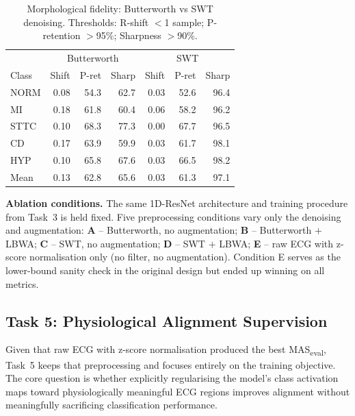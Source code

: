\documentclass{article}
\begin{document}
\begin{table}[h!]
\caption{Morphological fidelity: Butterworth vs SWT denoising.
Thresholds: R-shift $<$1 sample; P-retention $>$95\%; Sharpness $>$90\%.}
\label{tab:fidelity}
\vskip 0.1in
\begin{center}
\begin{small}
\begin{tabular}{lrrr|rrr}
\toprule
& \multicolumn{3}{c|}{Butterworth} & \multicolumn{3}{c}{SWT} \\
Class & Shift & P-ret & Sharp & Shift & P-ret & Sharp \\
\midrule
NORM & 0.08 & 54.3 & 62.7 & 0.03 & 52.6 & 96.4 \\
MI   & 0.18 & 61.8 & 60.4 & 0.06 & 58.2 & 96.2 \\
STTC & 0.10 & 68.3 & 77.3 & 0.00 & 67.7 & 96.5 \\
CD   & 0.17 & 63.9 & 59.9 & 0.03 & 61.7 & 98.1 \\
HYP  & 0.10 & 65.8 & 67.6 & 0.03 & 66.5 & 98.2 \\
Mean & 0.13 & 62.8 & 65.6 & 0.03 & 61.3 & 97.1 \\
\bottomrule
\end{tabular}
\end{small}
\end{center}
\end{table}

\textbf{Ablation conditions.}
The same 1D-ResNet architecture and training procedure from Task~3
is held fixed. Five preprocessing conditions vary only the denoising
and augmentation:
\textbf{A} -- Butterworth, no augmentation;
\textbf{B} -- Butterworth $+$ LBWA;
\textbf{C} -- SWT, no augmentation;
\textbf{D} -- SWT $+$ LBWA;
\textbf{E} -- raw ECG with z-score normalisation only (no filter, no augmentation).
Condition E serves as the lower-bound sanity check in the original
design but ended up winning on all metrics.

\subsection{Task 5: Physiological Alignment Supervision}
\label{sec:task5}

Given that raw ECG with z-score normalisation produced the best
MAS\textsubscript{eval}, Task~5 keeps that preprocessing and focuses
entirely on the training objective. The core question is whether
explicitly regularising the model's class activation maps toward
physiologically meaningful ECG regions improves alignment without
meaningfully sacrificing classification performance.
\end{document}
